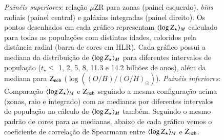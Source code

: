 \begin{figure}
	\centering
	\caption[Relação $\mu$ZR e comparação entre as metalicidades.]
	{\emph{Painéis superiores}: relação $\mu$ZR para zonas (painel esquerdo), {\em bins} radiais
(painel central) e galáxias integradas (painel direito). Os pontos desenhados em cada gráfico
representam $\meanM{\log Z_\star}$ calculado para todas as populações com distintas idades,
coloridos pela distância radial (barra de cores em HLR). Cada gráfico possui a mediana da
distribuição de $\meanM{\log Z_\star}$ para diferentes intervalos de população ($t_\star \leq$ 1,
2, 5, 8, 11.3 e 14.2 bilhões de anos), além da mediana para $\mathrm{Z}_{\mathrm{neb}}$
($\log\left((O/H)/(O/H)_\odot\right)$). \emph{Painéis inferiores}: Comparação $\meanM{\log Z_\star}$
e $\mathrm{Z}_{\mathrm{neb}}$ seguindo a mesma configuração acima (zonas, raio e integrado) com as medianas por diferentes
intervalos de população no cálculo de $\meanM{\log Z_\star}$ também. Seguindo o mesmo padrão de
cores para as medianas, abaixo de cada gráfico vemos o coeficiente de correlação de Spearmann entre
$\meanM{\log Z_\star}$ e $\mathrm{Z}_{\mathrm{neb}}$.}
	\label{fig:ZstarvsZneb}
\end{figure}

